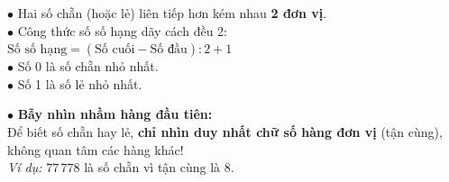 \documentclass[14pt,a4paper,oneside]{extbook}
\begin{document}
\noindent
\begin{minipage}[t]{0.54\textwidth}
  \begin{tcolorbox}[
    enhanced,
    title={\footnotesize\bfseries\color{white}\faKey\ Dãy số chẵn / số lẻ cách đều},
    colback=green!3!white,
    colframe=green!60!black,
    arc=2.5mm, boxrule=0.8pt, top=1.8mm, bottom=1.8mm, left=2.2mm, right=2.2mm
  ]
    \footnotesize
    $\bullet$ Hai số chẵn (hoặc lẻ) liên tiếp hơn kém nhau \textbf{2 đơn vị}.\\
    $\bullet$ Công thức số số hạng dãy cách đều 2:\\
    $\text{Số số hạng} = (\text{Số cuối} - \text{Số đầu}) : 2 + 1$\\
    $\bullet$ Số 0 là số chẵn nhỏ nhất.\\
    $\bullet$ Số 1 là số lẻ nhỏ nhất.
  \end{tcolorbox}
\end{minipage}%
\hfill
\begin{minipage}[t]{0.44\textwidth}
  \begin{tcolorbox}[
    enhanced,
    title={\footnotesize\bfseries\color{white}\faExclamationTriangle\ Mẹo tránh bẫy trắc nghiệm},
    colback=red!2!white,
    colframe=red!70!black,
    arc=2.5mm, boxrule=0.8pt, top=1.8mm, bottom=1.8mm, left=2.2mm, right=2.2mm
  ]
    \footnotesize
    $\bullet$ \textbf{Bẫy nhìn nhầm hàng đầu tiên:}\\
    Để biết số chẵn hay lẻ, \textbf{chỉ nhìn duy nhất chữ số hàng đơn vị} (tận cùng), không quan tâm các hàng khác!\\
    \textit{Ví dụ:} $77\,778$ là số chẵn vì tận cùng là 8.
  \end{tcolorbox}
\end{minipage}
\end{document}
